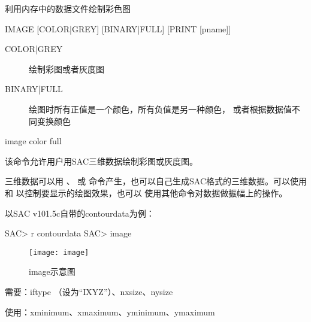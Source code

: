 \label{cmd:image}

利用内存中的数据文件绘制彩色图

\begin{SACSTX}
IMAGE [COLOR|GREY] [BINARY|FULL] [PRINT [pname]]
\end{SACSTX}

\begin{description}
\item [COLOR|GREY] 绘制彩图或者灰度图
\item [BINARY|FULL] 绘图时所有正值是一个颜色，所有负值是另一种颜色，
    或者根据数据值不同变换颜色
\end{description}

\begin{SACDFT}
image color full
\end{SACDFT}

该命令允许用户用SAC三维数据绘制彩图或灰度图。

三维数据可以用 、 或
 命令产生，也可以自己生成SAC格式的三维数据。可以使用
 和  以控制要显示的绘图效果，也可以
使用其他命令对数据做振幅上的操作。

以SAC v101.5c自带的contourdata为例：
\begin{SACCode}
SAC> r contourdata
SAC> image
\end{SACCode}

\begin{figure}[!ht]
\centering
\texttt{[image: image]}
\caption{image示意图}
\end{figure}

需要：iftype （设为``IXYZ''）、nxsize、nysize

使用：xminimum、xmaximum、yminimum、ymaximum
